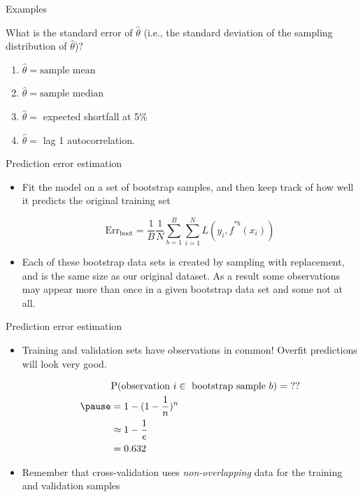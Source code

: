 \documentclass[14pt]{beamer}
\begin{document}
\begin{frame}[plain]{Examples}

What is the standard error of $\hat\theta$ (i.e., the standard deviation of the sampling distribution of $\hat \theta$)?

\begin{enumerate}
	\item $\hat \theta = \text{sample mean}$ 

	\item $\hat \theta = \text{sample median}$

\item $\hat\theta = $ expected shortfall at 5\%

\item $\hat\theta=$ lag 1 autocorrelation.
\end{enumerate}



\end{frame}



\begin{frame}[plain]{Prediction error estimation}

\begin{itemize}
	\item Fit the model on a set of bootstrap samples, and then keep track of how well it predicts the original training set
	
	$$ \text{Err}_{\text{boot}} = \frac1B \frac1N \sum_{b = 1}^B \sum_{i = 1}^N L(y_i, \hat f^{*b}(x_i))$$ 
	\pause
	\item Each of these bootstrap data sets is created by sampling with replacement, and is the same size as our original dataset. As a result some observations may appear more than once in a given bootstrap data set and some not at all.
\end{itemize}

\end{frame}

\begin{frame}[plain]{Prediction error estimation}
%

\begin{itemize}
	\item Training and validation sets have observations in common! Overfit predictions will look very good.
		
\begin{align*}
	&\text{P}(\text{observation~} i \in \text{~bootstrap sample~} b) = ~??\\
	\pause
	&= 1 - (1 - \frac1n)^n \\
	&\approx 1 - \frac1e \\
	&= 0.632
\end{align*}
	
	\item Remember that cross-validation uses \emph{non-overlapping} data for the training and validation samples
\end{itemize}



\end{frame}
\end{document}
